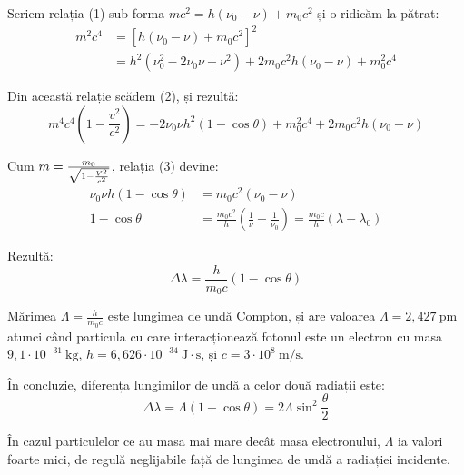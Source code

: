 Scriem relația (1) sub forma
\( mc^2 = h(\nu_0 - \nu) + m_0c^2 \)
și o ridicăm la pătrat:
\begin{align*}
    m^2c^4 &= [h(\nu_0 - \nu) + m_0c^2]^2 \\
           &= h^2(\nu_0^2 - 2\nu_0\nu + \nu^2) + 2m_0c^2h(\nu_0 - \nu) + m_0^2c^4
\end{align*}

Din această relație scădem (2), și rezultă:
\begin{equation}
    m^4c^4 \left(1 - \frac{v^2}{c^2}\right)
    = -2\nu_0\nu h^2(1 - \cos\theta) + m_0^2c^4 + 2m_0c^2h(\nu_0 - \nu)
\end{equation}

Cum \( m = \frac{m_0}{\sqrt{1 - \frac{V^2}{c^2}}} \), relația (3) devine:
\begin{align*}
    \nu_0\nu h(1 - \cos\theta) &= m_0c^2 (\nu_0 - \nu) \\
    1 - \cos\theta &= \frac{m_0c^2}{h} \left(\frac{1}{\nu} - \frac{1}{\nu_0}\right)
    = \frac{m_0c}{h}(\lambda - \lambda_0)
\end{align*}

Rezultă:
\[ \Delta\lambda = \frac{h}{m_0c}(1 - \cos\theta) \]

Mărimea \( \Lambda = \frac{h}{m_0c} \) este lungimea de undă Compton, și are
valoarea \( \Lambda = 2,427 ~ \mathrm{pm} \) atunci când particula cu care
interacționează fotonul este un electron cu masa
\( 9,1 \cdot 10^{-31} ~ \mathrm{kg} \),
\( h = 6,626 \cdot 10^{-34} ~ \mathrm{J \cdot s} \),
și \( c = 3\cdot10^8 ~ \mathrm{m/s} \).

În concluzie, diferența lungimilor de undă a celor două radiații este:
\[ \Delta\lambda = \Lambda(1 - \cos\theta) = 2\Lambda\sin^2\frac{\theta}{2} \]

În cazul particulelor ce au masa mai mare decât masa electronului, $\Lambda$ ia valori
foarte mici, de regulă neglijabile față de lungimea de undă a radiației incidente.
